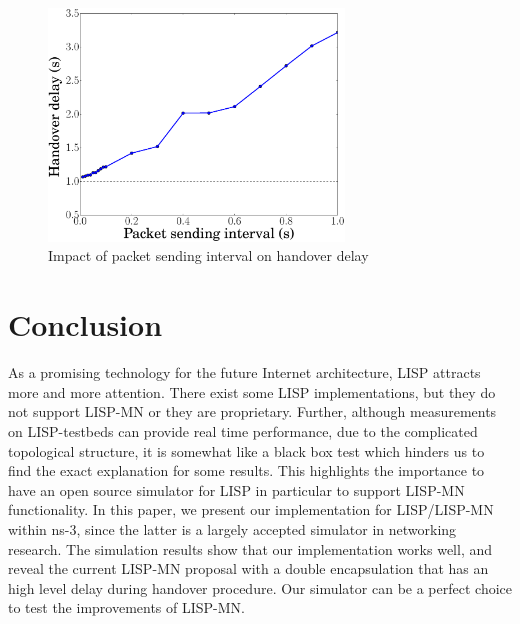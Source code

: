 

\begin{figure}[!th]
	\centering
	\includegraphics[width=0.7\textwidth]{Pics/LISP_mobility_xTR_PacketInterval}
	\caption{Impact of packet sending interval on handover delay}
	\label{LISP_mobility_xTR_PacketInterval}
\end{figure}

\section{Conclusion}
\label{sec:ns3_conclusion}
As a promising technology for the future Internet architecture, LISP attracts more and more attention. There exist some LISP implementations, but they do not support LISP-MN or they are proprietary. Further, although measurements on LISP-testbeds can provide real time performance, due to the complicated topological structure, it is somewhat like a black box test which hinders us to find the exact explanation for some results. This highlights the importance to have an open source simulator for LISP in particular to support LISP-MN functionality. In this paper, we present our implementation for LISP/LISP-MN within ns-3, since the latter is a largely accepted simulator in networking research. The simulation results show that our implementation works well, and reveal the current LISP-MN proposal with a double encapsulation that has an high level delay during handover procedure. Our simulator can be a perfect choice to test the improvements of LISP-MN.

